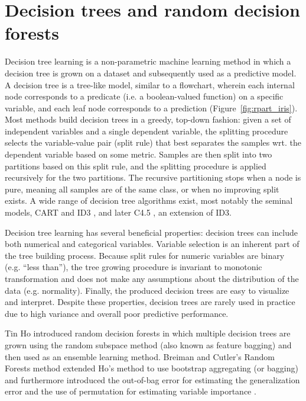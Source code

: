 \section{Decision trees and random decision forests}
Decision tree learning is a non-parametric machine learning method in which a decision tree is grown on a dataset and subsequently used as a predictive model. A decision tree is a tree-like model, similar to a flowchart, wherein each internal node corresponds to a predicate (i.e. a boolean-valued function) on a specific variable, and each leaf node corresponds to a prediction (Figure~\ref{fig:rpart_iris}). Most methods build decision trees in a greedy, top-down fashion: given a set of independent variables and a single dependent variable, the splitting procedure selects the variable-value pair (split rule) that best separates the samples wrt. the dependent variable based on some metric. Samples are then split into two partitions based on this split rule, and the splitting procedure is applied recursively for the two partitions. The recursive partitioning stops when a node is pure, meaning all samples are of the same class, or when no improving split exists. A wide range of decision tree algorithms exist, most notably the seminal models, CART \cite{Breiman1984} and ID3 \cite{Quinlan1986}, and later C4.5 \cite{Quinlan1994}, an extension of ID3.

Decision tree learning has several beneficial properties: decision trees can include both numerical and categorical variables. Variable selection is an inherent part of the tree building process. Because split rules for numeric variables are binary (e.g. \enquote{less than}), the tree growing procedure is invariant to monotonic transformation and does not make any assumptions about the distribution of the data (e.g. normality). Finally, the produced decision trees are easy to visualize and interpret. Despite these properties, decision trees are rarely used in practice due to high variance and overall poor predictive performance.

Tin Ho introduced random decision forests in which multiple decision trees are grown using the random subspace method \cite{Ho1995} (also known as feature bagging) and then used as an ensemble learning method. Breiman and Cutler's Random Forests method extended Ho's method to use bootstrap aggregating (or bagging) and furthermore introduced the out-of-bag error for estimating the generalization error and the use of permutation for estimating variable importance \cite{Breiman2001,Breiman2003}.


